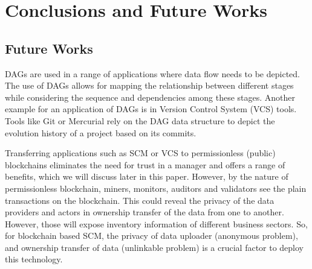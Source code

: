\chapter{Conclusions and Future Works} \label{ch:conclusion}


\section{Future Works}

DAGs are used in a range of applications where data flow needs to be depicted. The use of DAGs allows for mapping the relationship between different stages while considering the sequence and dependencies among these stages. Another example for an application of DAGs is in Version Control System (VCS) tools. Tools like Git \cite{gitonline2023} or Mercurial \cite{mercurial} rely on the DAG data structure to depict the evolution history of a project based on its commits. 

Transferring applications such as SCM or VCS to permissionless (public) blockchains eliminates the need for trust in a manager and offers a range of benefits, which we will discuss later in this paper. However, by the nature of permissionless blockchain, miners, monitors, auditors and validators see the plain transactions on the blockchain.  This could reveal the privacy of the data providers  and actors in  ownership transfer  of the data from one to another.  However, those will expose inventory information of different business sectors.  So, for blockchain based SCM, the privacy of data uploader (anonymous problem), and ownership transfer of data (unlinkable problem) is a crucial factor to deploy this technology. 